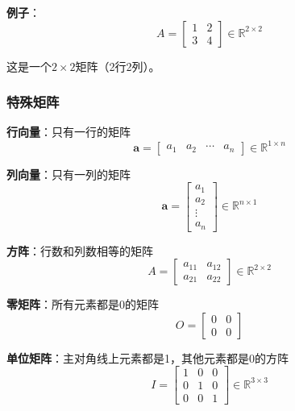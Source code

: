 \documentclass[12pt,a4paper]{article}
\begin{document}
\textbf{例子}：
\begin{equation}
A = \begin{bmatrix} 1 & 2 \\ 3 & 4 \end{bmatrix} \in \mathbb{R}^{2 \times 2}
\end{equation}

这是一个$2 \times 2$矩阵（2行2列）。

\subsubsection{特殊矩阵}

\textbf{行向量}：只有一行的矩阵
\begin{equation}
\bm{a} = \begin{bmatrix} a_1 & a_2 & \cdots & a_n \end{bmatrix} \in \mathbb{R}^{1 \times n}
\end{equation}

\textbf{列向量}：只有一列的矩阵
\begin{equation}
\bm{a} = \begin{bmatrix} a_1 \\ a_2 \\ \vdots \\ a_n \end{bmatrix} \in \mathbb{R}^{n \times 1}
\end{equation}

\textbf{方阵}：行数和列数相等的矩阵
\begin{equation}
A = \begin{bmatrix} a_{11} & a_{12} \\ a_{21} & a_{22} \end{bmatrix} \in \mathbb{R}^{2 \times 2}
\end{equation}

\textbf{零矩阵}：所有元素都是0的矩阵
\begin{equation}
O = \begin{bmatrix} 0 & 0 \\ 0 & 0 \end{bmatrix}
\end{equation}

\textbf{单位矩阵}：主对角线上元素都是1，其他元素都是0的方阵
\begin{equation}
I = \begin{bmatrix} 1 & 0 & 0 \\ 0 & 1 & 0 \\ 0 & 0 & 1 \end{bmatrix} \in \mathbb{R}^{3 \times 3}
\end{equation}
\end{document}
